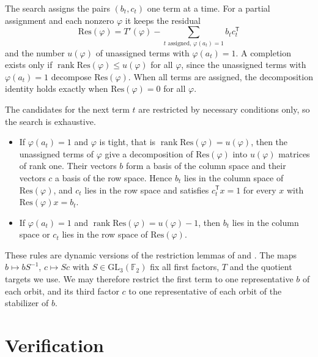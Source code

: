 \documentclass[11pt]{amsart}
\theoremstyle{definition}
\theoremstyle{remark}
\numberwithin{equation}{section}
\newcommand{\F}{\mathbb{F}_2}
\newcommand{\GL}{\mathrm{GL}_3(\F)}
\newcommand{\rk}{\operatorname{rank}}
\begin{document}
The search assigns the pairs $(b_t,c_t)$ one term at a time. For a partial assignment and each nonzero $\varphi$ it keeps the residual
\[
\mathrm{Res}(\varphi)=T'(\varphi)-\sum_{t\text{ assigned},\,\varphi(a_t)=1}b_tc_t^{\mathsf T}
\]
and the number $u(\varphi)$ of unassigned terms with $\varphi(a_t)=1$. A completion exists only if $\rk\mathrm{Res}(\varphi)\le u(\varphi)$ for all $\varphi$, since the unassigned terms with $\varphi(a_t)=1$ decompose $\mathrm{Res}(\varphi)$. When all terms are assigned, the decomposition identity holds exactly when $\mathrm{Res}(\varphi)=0$ for all $\varphi$.

The candidates for the next term $t$ are restricted by necessary conditions only, so the search is exhaustive.
\begin{itemize}
\item If $\varphi(a_t)=1$ and $\varphi$ is tight, that is $\rk\mathrm{Res}(\varphi)=u(\varphi)$, then the unassigned terms of $\varphi$ give a decomposition of $\mathrm{Res}(\varphi)$ into $u(\varphi)$ matrices of rank one. Their vectors $b$ form a basis of the column space and their vectors $c$ a basis of the row space. Hence $b_t$ lies in the column space of $\mathrm{Res}(\varphi)$, and $c_t$ lies in the row space and satisfies $c_t^{\mathsf T}x=1$ for every $x$ with $\mathrm{Res}(\varphi)x=b_t$.
\item If $\varphi(a_t)=1$ and $\rk\mathrm{Res}(\varphi)=u(\varphi)-1$, then $b_t$ lies in the column space or $c_t$ lies in the row space of $\mathrm{Res}(\varphi)$.
\end{itemize}
These rules are dynamic versions of the restriction lemmas of \cite[Lemmas~2 and~3]{DAm26} and \cite[Lemma~4.1]{Wan26b}.
The maps $b\mapsto bS^{-1}$, $c\mapsto Sc$ with $S\in\GL$ fix all first factors, $T$ and the quotient targets we use. We may therefore restrict the first term to one representative $b$ of each orbit, and its third factor $c$ to one representative of each orbit of the stabilizer of $b$.


\section{Verification}\label{sec:verify}
\end{document}
